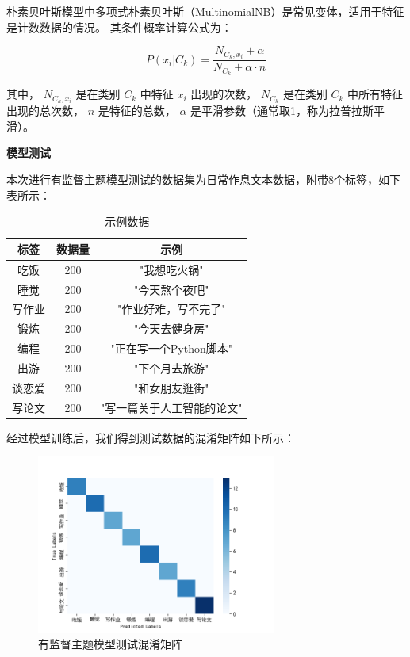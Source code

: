 \documentclass[UTF8,a4paper,15pt,titlepage,oneside]{ctexbook}
\begin{document}
朴素贝叶斯模型中多项式朴素贝叶斯（MultinomialNB）是常见变体，适用于特征是计数数据的情况。
其条件概率计算公式为：

\begin{equation}
P(x_i|C_k) = \frac{N_{C_k, x_i} + \alpha}{N_{C_k} + \alpha \cdot n}
\end{equation}

其中，
\(N_{C_k, x_i}\) 是在类别 \(C_k\) 中特征 \(x_i\) 出现的次数，
\(N_{C_k}\) 是在类别 \(C_k\) 中所有特征出现的总次数，
\(n\) 是特征的总数，
\(\alpha\) 是平滑参数（通常取1，称为拉普拉斯平滑）。

\vskip 0.2cm
\noindent
\textbf{模型测试}

本次进行有监督主题模型测试的数据集为日常作息文本数据，附带8个标签，如下表所示：

\begin{table}[H]
  \centering
  \begin{tabular}{ccc}
  \toprule
  标签&数据量&示例\\
  \midrule
  吃饭 & 200&"我想吃火锅"\\
  睡觉 & 200&"今天熬个夜吧"\\
  写作业 &200&"作业好难，写不完了"\\
  锻炼 & 200&"今天去健身房"\\
  编程 & 200&"正在写一个Python脚本"\\
  出游 & 200&"下个月去旅游"\\
  谈恋爱 & 200&"和女朋友逛街"\\
  写论文 & 200&"写一篇关于人工智能的论文"\\
  
  \bottomrule
  \end{tabular}
  \caption{示例数据}
  \end{table}

经过模型训练后，我们得到测试数据的混淆矩阵如下所示：

\begin{figure}[H]
  \centering
  \includegraphics[width=0.7\textwidth,keepaspectratio=false]{pictures/23.png} %
  \caption{有监督主题模型测试混淆矩阵}
  
\end{figure}
\end{document}
